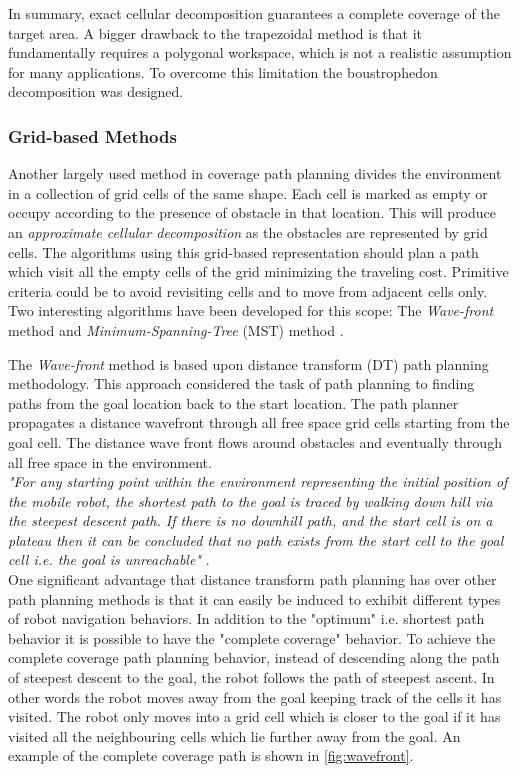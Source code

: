 In summary, exact cellular decomposition guarantees a complete coverage of the target area. A bigger drawback to the trapezoidal method is that it fundamentally requires a polygonal workspace, which is not a realistic assumption for many applications. To overcome this limitation the boustrophedon decomposition was designed.

\subsubsection{Grid-based Methods} %
\label{ssub:grid_based_methods}
Another largely used method in coverage path planning divides the environment in a collection of grid cells of the same shape. Each cell is marked as empty or occupy according to the presence of obstacle in that location. This will produce an \textit{approximate cellular decomposition} as the obstacles are represented by grid cells.
The algorithms using this grid-based representation should plan a path which visit all the empty cells of the grid minimizing the traveling cost. Primitive criteria could be to avoid revisiting cells and to move from adjacent cells only. Two interesting algorithms have been developed for this scope: The \textit{Wave-front} method \cite{Zelinsky93planningpaths} and \textit{Minimum-Spanning-Tree} (MST) method \cite{Gabriely2001}.\par
The \textit{Wave-front} method is based upon distance transform (DT) path planning methodology. This approach considered the task of path planning to finding paths from the goal location back to the start location. The path planner propagates a distance wavefront through all free space grid cells starting from the goal cell. The distance wave front flows around obstacles and eventually through all free space in the environment.\\
 \textit{"For any starting point within the environment representing the initial position of the mobile robot, the shortest path to the goal is traced by walking down hill via the steepest descent path. If there is no downhill path, and the start cell is on a plateau then it can be concluded that no path exists from the start cell to the goal cell i.e. the goal is unreachable"} \cite{Zelinsky93planningpaths}.\\
One significant advantage that distance transform path planning has over other path planning methods is that it can easily be induced to exhibit different types of robot navigation behaviors. In addition to the "optimum" i.e. shortest path behavior it is possible to have the "complete coverage" behavior. To achieve the complete coverage path planning behavior, instead of descending along the path of steepest descent to the goal, the robot follows the path of steepest ascent. In other words the robot moves away from the goal keeping track of the cells it has visited. The robot only moves into a grid cell which is closer to the goal if it has visited all the neighbouring cells which lie further away from the goal. An example of the complete coverage path is shown in \autoref{fig:wavefront}.
